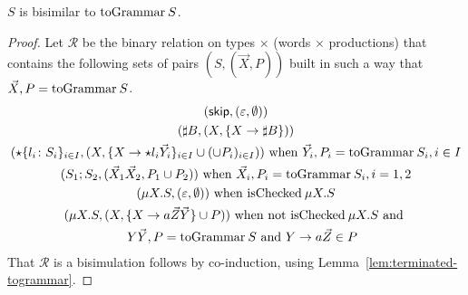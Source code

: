\begin{theorem}
\label{thm:cfst_vs_grammar}
  $S$ is bisimilar to $\toGrammarf{S}$.
\end{theorem}

\begin{proof}
  Let $\mathcal R$ be the binary relation on types $\times$ (words
  $\times$ productions) that contains the following sets of pairs
  $(S, (\vec X, P))$ built in such a way that $\vec X, P = \toGrammarf S$.
  \begin{gather*}
    (\skipk, (\varepsilon, \emptyset))
    \\
    (\sharp B, (X, \{X \rightarrow \sharp B\}))
    \\
    (\star\{l_i\colon S_i\}_{i\in I}, (X, \{X \rightarrow \star l_i
    \vec Y_i\}_{i\in I} \cup (\cup  P_i)_{i\in I}))
    \text{ when } \vec Y_i, P_i = \toGrammarf{S_i}, i \in I
    \\
    (S_1;S_2, (\vec X_1\vec X_2,  P_1 \cup  P_2))
    \text{ when } \vec X_i, P_i = \toGrammarf{S_i}, i = 1,2
    \\
    (\mu X.S, (\varepsilon, \emptyset))
    \text{ when } \isCheckedf \mu X.S
    \\
    (\mu X.S, (X, \{X \rightarrow a \vec Z\vec Y\} \cup  P))
    \text{ when not }  \isCheckedf \mu X.S \text{ and }
    \\\quad
    Y\vec Y, P = \toGrammarf{S}
    \text{ and }
    Y \rightarrow a \vec Z \in  P
  \end{gather*}
  That $\mathcal R$ is a bisimulation follows by co-induction, using
  Lemma~\ref{lem:terminated-togrammar}. %
\end{proof}

